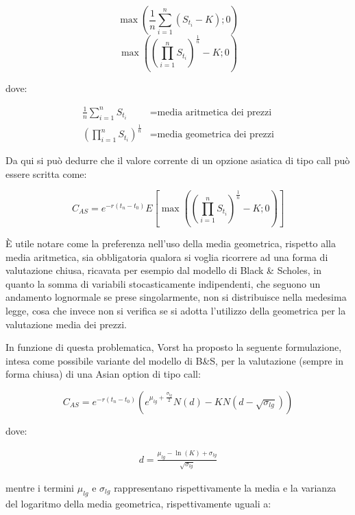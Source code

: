 \documentclass[12pt,a4paper]{report}
\begin{document}
\begin{equation}
    \max\left(\frac{1}{n} \sum_{i=1}^{n} (S_{t_i} - K); 0\right)
\end{equation}
\begin{equation}
    \max\left((\prod_{i=1}^{n} S_{t_i})^\frac{1}{n} - K; 0\right)
\end{equation}

dove:

\begin{align*}
\frac{1}{n} \sum_{i=1}^{n} S_{t_i} &= \text{media aritmetica dei prezzi} \\
\left(\prod_{i=1}^{n} S_{t_i}\right)^{\frac{1}{n}} &= \text{media geometrica dei prezzi}
\end{align*}

Da qui si può dedurre che il valore corrente di un opzione asiatica di tipo call può essere scritta come: 

\begin{equation}
    C_{AS} = e^{-r(t_n - t_0)} E\left[\max\left(\left(\prod_{i=1}^{n} 
    S_{t_i}\right)^{\frac{1}{n}} - K; 0\right)\right]
\end{equation}

È utile notare come la preferenza nell'uso della media geometrica, rispetto alla media aritmetica, sia obbligatoria qualora si voglia ricorrere ad una forma di valutazione chiusa, ricavata per esempio dal modello di Black \& Scholes, in quanto la somma di variabili stocasticamente indipendenti, che seguono un andamento lognormale se prese singolarmente, non si distribuisce nella medesima legge, cosa che invece non si verifica se si adotta l'utilizzo della geometrica per la valutazione media dei prezzi.

In funzione di questa problematica, Vorst ha proposto la seguente formulazione, intesa come possibile variante del modello di B\&S, per la valutazione (sempre in forma chiusa) di una Asian option di tipo call:

\begin{equation}
    C_{AS} = e^{-r(t_n - t_0)} \left( e^{\mu_{lg} + \frac{\sigma_{lg}}{2}} N(d) - KN\left(d - \sqrt{\sigma_{lg}}\right) \right)
\end{equation}

dove:

\begin{align*}
    d = \frac{\mu_{lg} - \ln(K) + \sigma_{lg}}{\sqrt{\sigma_{lg}}}
\end{align*}

mentre i termini $\mu_{lg}$ e $\sigma_{lg}$ rappresentano rispettivamente la media e la varianza del logaritmo della media geometrica, rispettivamente uguali a:
\end{document}
